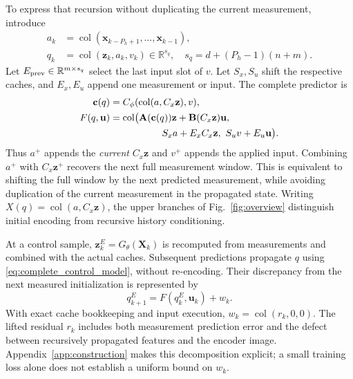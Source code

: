 \documentclass[journal]{IEEEtran}
\newcommand{\vx}{\mathbf{x}}
\newcommand{\vu}{\mathbf{u}}
\newcommand{\vz}{\mathbf{z}}
\newcommand{\vc}{\mathbf{c}}
\newcommand{\mA}{\mathbf{A}}
\newcommand{\mB}{\mathbf{B}}
\newcommand{\mX}{\mathbf{X}}
\newcommand{\R}{\mathbb{R}}
\newcommand{\col}{\operatorname{col}}
\begin{document}
To express that recursion without duplicating the current measurement, introduce
\begin{equation}
\begin{split}
a_k&=\col(\vx_{k-P_h+1},\ldots,\vx_{k-1}),\\
q_k&=\col(\vz_k,a_k,v_k)\in\R^{s_q},\quad
s_q=d+(P_h-1)(n+m).
\end{split}
\label{eq:augmented_state}
\end{equation}
Let $E_{\rm prev}\in\R^{m\times s_q}$ select the last input slot of $v$. Let $S_x,S_u$ shift the respective caches, and $E_x,E_u$ append one measurement or input. The complete predictor is
\begin{equation}
\begin{split}
\vc(q)&=C_\phi(\col(a,C_x\vz),v),\\
F(q,\vu)&=\col\bigl(\mA(\vc(q))\vz+\mB(C_x\vz)\vu,\\
&\hspace{19mm}S_xa+E_xC_x\vz,\ S_uv+E_u\vu\bigr).
\end{split}
\label{eq:complete_control_model}
\end{equation}
Thus $a^+$ appends the \emph{current} $C_x\vz$ and $v^+$ appends the applied input. Combining $a^+$ with $C_x\vz^+$ recovers the next full measurement window. This is equivalent to shifting the full window by the next predicted measurement, while avoiding duplication of the current measurement in the propagated state. Writing $X(q)=\col(a,C_x\vz)$, the upper branches of Fig.~\ref{fig:overview} distinguish initial encoding from recursive history conditioning.

At a control sample, $\vz_k^E=G_\theta(\mX_k)$ is recomputed from measurements and combined with the actual caches. Subsequent predictions propagate $q$ using \eqref{eq:complete_control_model}, without re-encoding. Their discrepancy from the next measured initialization is represented by
\begin{equation}
q_{k+1}^E=F(q_k^E,\vu_k)+w_k.
\label{eq:residual_definition}
\end{equation}
With exact cache bookkeeping and input execution, $w_k=\col(r_k,0,0)$. The lifted residual $r_k$ includes both measurement prediction error and the defect between recursively propagated features and the encoder image. Appendix~\ref{app:construction} makes this decomposition explicit; a small training loss alone does not establish a uniform bound on $w_k$.
\end{document}

